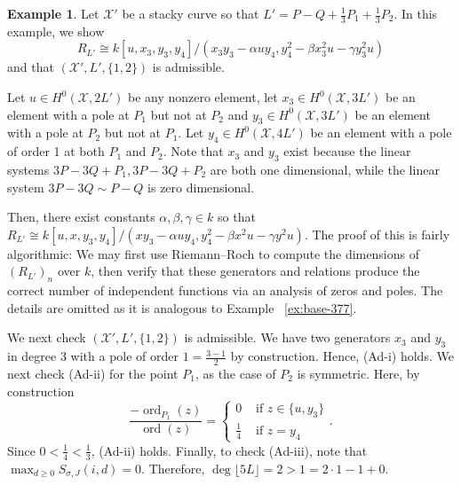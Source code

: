\documentclass{amsart}
\theoremstyle{plain}
\theoremstyle{definition}
\newtheorem{example}[thm]{Example}
\theoremstyle{remark}
\numberwithin{equation}{section}
\newcommand \sx{\mathscr X}
\DeclareMathOperator{\ord}{ord}
\newcommand \halfcan{L}
\begin{document}
\begin{example}
\label{eg:base-1-33}
Let $\sx'$ be a stacky curve so that $\halfcan' = P - Q + \frac{1}{3}P_1 + \frac{1}{3}P_2$. In this example, we show
$$R_{\halfcan'} \cong k[u, x_3, y_3, y_4]/(x_3 y_3- \alpha uy_4, y_4^2 - \beta x_3^2 u - \gamma y_3^2u)$$
and that $(\sx', \halfcan',\{1,2\})$ is admissible.

Let $u \in H^0(\sx,2\halfcan')$ be any nonzero element, let $x_3 \in H^0(\sx,3\halfcan')$ be an element with a pole at $P_1$ but not at $P_2$ and $y_3 \in H^0(\sx,3\halfcan')$ be an element with a pole at $P_2$ but not at $P_1$. Let $y_4 \in H^0(\sx,4\halfcan')$ be an element with a pole of order 1 at both $P_1$ and $P_2$. Note that $x_3$ and $y_3$ exist because the linear systems $3P - 3Q + P_1, 3P - 3Q + P_2$ are both one dimensional, while the linear system $3P - 3Q \sim P - Q$ is zero dimensional.

Then, there exist constants $\alpha,\beta,\gamma \in k$ so that 
$R_{\halfcan'} \cong k[u, x, y_3, y_4]/(xy_3- \alpha uy_4, y_4^2 - \beta x^2 u - \gamma y^2u).$ The proof of this is fairly algorithmic: We may first use Riemann--Roch to compute the dimensions of $(R_{\halfcan'})_n$ over $k$, then verify that these generators and relations produce the correct number of independent functions via an analysis of zeros and poles. The details are omitted as it is analogous to Example ~\ref{ex:base-377}.

We next check $(\sx', \halfcan',\{1,2\})$ is admissible. We have two generators $x_3$ and $y_3$ in degree 3 with a pole of order $1=\frac{3- 1}{2}$ by construction. Hence, (Ad-i) holds. We next check (Ad-ii) for the point $P_1$, as the case of $P_2$ is symmetric. Here, by construction
$$
\frac{-\ord_{P_1}(z)}{\ord(z)} = \begin{cases}
	0 &\text{ if }z \in \{u, y_3\}\\
	\frac{1}{4} &\text{ if }z = y_4
\end{cases}.$$
Since $0 < \frac{1}{4} < \frac{1}{3}$, (Ad-ii) holds.
Finally, to check (Ad-iii), note that $\max_{d \geq 0}S_{\sigma,J}(i,d) = 0.$ Therefore, $\deg \lfloor 5L \rfloor  = 2 > 1 = 2 \cdot 1 - 1 + 0$.
\end{example}
\end{document}
